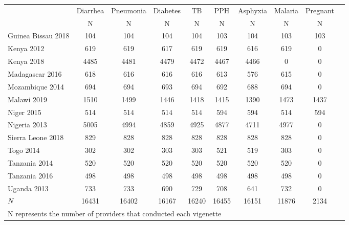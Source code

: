 \def\sym#1{\ifmmode^{#1}\else\(^{#1}\)\fi}
\begin{tabular}{l*{9}{c}}
\hline\hline
         &\multicolumn{1}{c}{Diarrhea}&\multicolumn{1}{c}{Pneumonia}&\multicolumn{1}{c}{Diabetes}&\multicolumn{1}{c}{TB}&\multicolumn{1}{c}{PPH}&\multicolumn{1}{c}{Asphyxia}&\multicolumn{1}{c}{Malaria}&\multicolumn{1}{c}{Pregnant}&\\
         &                                     N&       N&         N&          N&    N&        N&   N&        N\\
\hline
Guinea Bissau 2018&            {104}&        {104}&        {104}&        {104}&        {103}&        {104}&        {103}&        {103}\\
Kenya 2012&                            {619}&        {619}&    {617}&    {619}&    {619}&    {616}&        {619}&        {0}\\
Kenya 2018&                    {4485}&        {4481}&    {4479}&    {4472}&        {4467}&        {4466}&        {0}&            {0}\\
Madagascar 2016&               {618}&        {616}&    {616}&    {616}&        {613}&        {576}&        {615}&        {0}\\
Mozambique 2014&               {694}&        {694}&    {693}&    {694}&        {692}&        {688}&        {694}&        {0}\\
Malawi 2019&                   {1510}&        {1499}&    {1446}&    {1418}&        {1415}&        {1390}&        {1473}&        {1437}\\
Niger 2015&                    {514}&        {514}&    {514}&    {514}&        {594}&        {594}&        {514}&        {594}\\
Nigeria 2013&                  {5005}&        {4994}&    {4859}&    {4925}&        {4877}&        {4711}&        {4977}&        {0}\\
Sierra Leone 2018&             {829}&        {828}&    {828}&    {828}&        {828}&        {828}&        {828}&        {0}\\
Togo 2014&                             {302}&       {302}&   {303}&   {303}&       {521}&       {519}&       {303}&        {0}\\
Tanzania 2014&                 {520}&       {520}&   {520}&   {520}&       {520}&       {520}&       {520}&       {0}\\
Tanzania 2016&                 {498}&       {498}&   {498}&   {498}&       {498}&       {498}&       {498}&       {0}\\
Uganda 2013&                   {733}&       {733}&   {690}&   {729}&       {708}&       {641}&       {732}&       {0}\\
\hline
\(N\)    &                             {16431}&   {16402}&   {16167}&   {16240}&   {16455}&       {16151}&  {11876}&    {2134}\\
\hline\hline
\multicolumn{9}{l}{\footnotesize N represents the number of providers that conducted each vigenette}\\
\end{tabular}